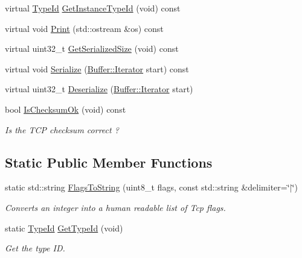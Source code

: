 \begin{DoxyCompactItemize}
virtual \hyperlink{classns3_1_1TypeId}{Type\+Id} \hyperlink{classns3_1_1TcpHeader_a339554f2886287a9ac8685dc0498f9a4}{Get\+Instance\+Type\+Id} (void) const 
\item 
virtual void \hyperlink{classns3_1_1TcpHeader_a5a653d5a604fc5b9d1c9721891197aaa}{Print} (std\+::ostream \&os) const 
\item 
virtual uint32\+\_\+t \hyperlink{classns3_1_1TcpHeader_a1cbb8a10b7838d428f2e94806d3ce807}{Get\+Serialized\+Size} (void) const 
\item 
virtual void \hyperlink{classns3_1_1TcpHeader_ab492a55e7e9a54ec4938035696877aa3}{Serialize} (\hyperlink{classns3_1_1Buffer_1_1Iterator}{Buffer\+::\+Iterator} start) const 
\item 
virtual uint32\+\_\+t \hyperlink{classns3_1_1TcpHeader_ac9ebbec6f00c4d7d040c1d68dbe8c793}{Deserialize} (\hyperlink{classns3_1_1Buffer_1_1Iterator}{Buffer\+::\+Iterator} start)
\item 
bool \hyperlink{classns3_1_1TcpHeader_a45ea6727fb985b78bc8e56969d208b5e}{Is\+Checksum\+Ok} (void) const 
\begin{DoxyCompactList}\small\item\em Is the T\+CP checksum correct ? \end{DoxyCompactList}\end{DoxyCompactItemize}
\subsection*{Static Public Member Functions}
\begin{DoxyCompactItemize}
\item 
static std\+::string \hyperlink{classns3_1_1TcpHeader_aaaa261ca12b0fb50e45c7083cec88cff}{Flags\+To\+String} (uint8\+\_\+t flags, const std\+::string \&delimiter=\char`\"{}$\vert$\char`\"{})
\begin{DoxyCompactList}\small\item\em Converts an integer into a human readable list of Tcp flags. \end{DoxyCompactList}\item 
static \hyperlink{classns3_1_1TypeId}{Type\+Id} \hyperlink{classns3_1_1TcpHeader_a52d4860834fecf23d3dffb54fae2506d}{Get\+Type\+Id} (void)
\begin{DoxyCompactList}\small\item\em Get the type ID. \end{DoxyCompactList}\end{DoxyCompactItemize}
